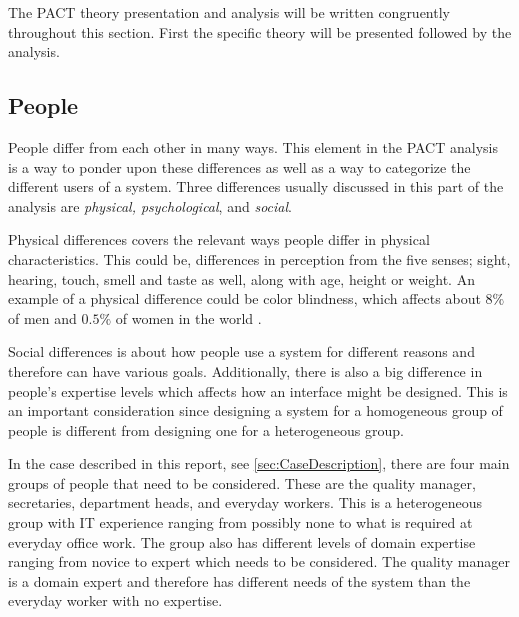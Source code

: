 The PACT theory presentation and analysis will be written congruently throughout this section. First the specific theory will be presented followed by the analysis.

\subsection{People}\label{PACT-people}
People differ from each other in many ways.
This element in the PACT analysis is a way to ponder upon these differences as well as a way to categorize the different users of a system.
Three differences usually discussed in this part of the analysis are \textit{physical, psychological}, and \textit{social}. \citep{Benyon}

Physical differences covers the relevant ways people differ in physical characteristics.
This could be, differences in perception from the five senses; sight, hearing, touch, smell and taste as well, along with age, height or weight.
An example of a physical difference could be color blindness, which affects about $8\%$ of men and $0.5\%$ of women in the world \cite{ColourBlind}.

Social differences is about how people use a system for different reasons and therefore can have various goals.
Additionally, there is also a big difference in people's expertise levels which affects how an interface might be designed.
This is an important consideration since designing a system for a homogeneous group of people is  different from designing one for a heterogeneous group. \citep{Benyon}

In the case described in this report, see \cref{sec:CaseDescription}, there are four main groups of people that need to be considered.
These are the quality manager, secretaries, department heads, and everyday workers.
This is a heterogeneous group with IT experience ranging from possibly none to what is required at everyday office work.
The group also has different levels of domain expertise ranging from novice to expert which needs to be considered.
The quality manager is a domain expert and therefore has different needs of the system than the everyday worker with no expertise.


